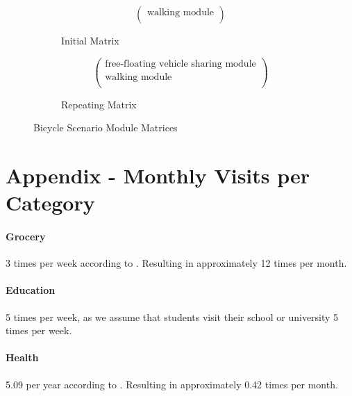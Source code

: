 
\begin{figure}[ht]
    \centering
    \begin{subfigure}{0.45\linewidth}
        \centering
        \[
        \begin{pmatrix}
            \text{walking module} \\
        \end{pmatrix}
        \]
        \caption{Initial Matrix}
    \end{subfigure}
    \hfill
    \begin{subfigure}{0.45\linewidth}
        \centering
        \[
        \begin{pmatrix}
            \text{free-floating vehicle sharing module} \\
            \text{walking module} \\
        \end{pmatrix}
        \]
        \caption{Repeating Matrix}
    \end{subfigure}
    \caption{Bicycle Scenario Module Matrices}
    \label{fig:bicycle_scenario_module_matrix}
\end{figure}


\section{Appendix - Monthly Visits per Category}
\label{app:monthly_visits_per_category}

\paragraph{Grocery}
3 times per week according to .
Resulting in approximately 12 times per month.

\paragraph{Education}
5 times per week, as we assume that students visit their school or university 5 times per week.

\paragraph{Health}
5.09 per year according to .
Resulting in approximately 0.42 times per month.

